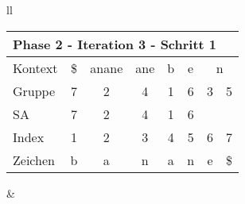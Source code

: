 \begin{table}[H]

\centering
\begin{adjustbox}{max width=\textwidth}
\begin{tabular}{ll}

\begin{tabular}{lccccccc}
\multicolumn{8}{l}{Phase 2 - Iteration 3 - Schritt 1}                                                                                                                                                             \\ \hline
\multicolumn{1}{l|}{Kontext} & \multicolumn{1}{c|}{\$} & \multicolumn{1}{c|}{anane} & \multicolumn{1}{c|}{\cellcolor[HTML]{\green}ane} & \multicolumn{1}{c|}{b} & \multicolumn{1}{c|}{e} & \multicolumn{2}{c}{n} \\
\multicolumn{1}{l|}{Gruppe}  & \multicolumn{1}{c|}{7}  & \multicolumn{1}{c|}{2}     & \multicolumn{1}{c|}{\cellcolor[HTML]{\green}4}   & \multicolumn{1}{c|}{1} & \multicolumn{1}{c|}{6} & 3         & 5          \\ 
\multicolumn{1}{l|}{SA}      & \multicolumn{1}{c|}{7}  & \multicolumn{1}{c|}{2}     & \multicolumn{1}{c|}{\cellcolor[HTML]{\green}4}   & \multicolumn{1}{c|}{1} & \multicolumn{1}{c|}{6} &           &            \\ \hline
\multicolumn{1}{l|}{Index}   & 1                       & 2                          & 3                                                & 4                      & 5                      & 6         & 7          \\
\multicolumn{1}{l|}{Zeichen} & b                       & a                          & n                                                & a                      & n                      & e         & \$        
\end{tabular}

&


\end{tabular}
\end{adjustbox}
\end{table}
